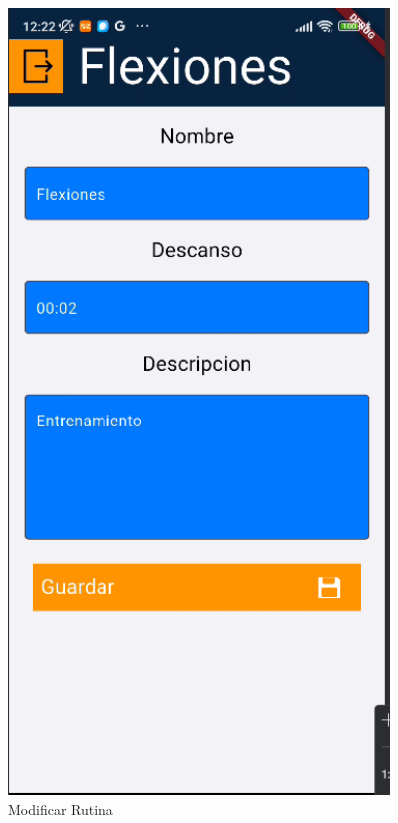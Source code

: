 \begin{figure}[H]
   \begin{minipage}{0.45\textwidth}
      \centering
      \includegraphics[width=0.9\textwidth]{pantallas/modRutina.png}
      \caption{Modificar Rutina}
      \label{fig:modRutina}
   \end{minipage}
\end{figure}


